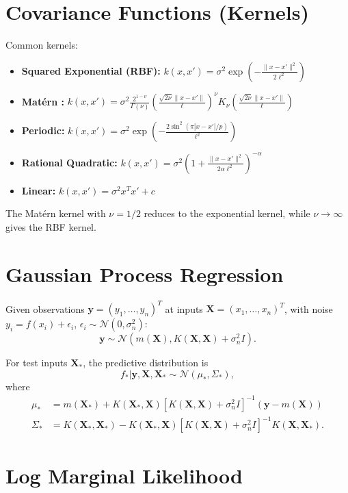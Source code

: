 \section{Covariance Functions (Kernels)}

Common kernels:
\begin{itemize}
    \item \textbf{Squared Exponential (RBF):} $k(x,x') = \sigma^2 \exp\left(-\frac{\|x-x'\|^2}{2\ell^2}\right)$
    \item \textbf{Matérn :} $k(x,x') = \sigma^2 \frac{2^{1-\nu}}{\Gamma(\nu)} \left(\frac{\sqrt{2\nu}\|x-x'\|}{\ell}\right)^\nu K_\nu\left(\frac{\sqrt{2\nu}\|x-x'\|}{\ell}\right)$
    \item \textbf{Periodic:} $k(x,x') = \sigma^2 \exp\left(-\frac{2\sin^2(\pi|x-x'|/p)}{\ell^2}\right)$
    \item \textbf{Rational Quadratic:} $k(x,x') = \sigma^2 \left(1 + \frac{\|x-x'\|^2}{2\alpha\ell^2}\right)^{-\alpha}$
    \item \textbf{Linear:} $k(x,x') = \sigma^2 x^T x' + c$
\end{itemize}

The Matérn kernel with $\nu = 1/2$ reduces to the exponential kernel, while $\nu \to \infty$ gives the RBF kernel.

\section{Gaussian Process Regression}

Given observations $\mathbf{y} = (y_1, \ldots, y_n)^T$ at inputs $\mathbf{X} = (x_1, \ldots, x_n)^T$, with noise $y_i = f(x_i) + \epsilon_i$, $\epsilon_i \sim \mathcal{N}(0, \sigma_n^2)$:
\[
\mathbf{y} \sim \mathcal{N}(m(\mathbf{X}), K(\mathbf{X}, \mathbf{X}) + \sigma_n^2 I).
\]

For test inputs $\mathbf{X}_*$, the predictive distribution is
\[
f_* | \mathbf{y}, \mathbf{X}, \mathbf{X}_* \sim \mathcal{N}(\mu_*, \Sigma_*),
\]
where
\begin{align*}
\mu_* &= m(\mathbf{X}_*) + K(\mathbf{X}_*, \mathbf{X}) [K(\mathbf{X}, \mathbf{X}) + \sigma_n^2 I]^{-1} (\mathbf{y} - m(\mathbf{X})) \\
\Sigma_* &= K(\mathbf{X}_*, \mathbf{X}_*) - K(\mathbf{X}_*, \mathbf{X}) [K(\mathbf{X}, \mathbf{X}) + \sigma_n^2 I]^{-1} K(\mathbf{X}, \mathbf{X}_*).
\end{align*}

\section{Log Marginal Likelihood}

